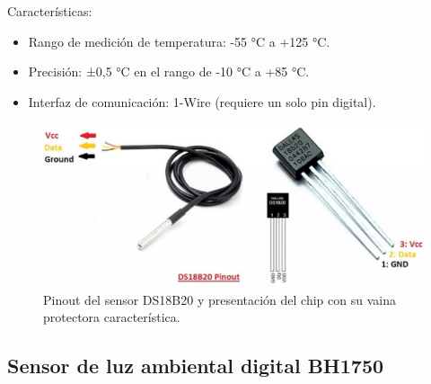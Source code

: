 Características:

\begin{itemize}
	\item Rango de medición de temperatura: -55 °C a +125 °C.
	\item Precisión: ±0,5 °C en el rango de -10 °C a +85 °C.
	\item Interfaz de comunicación: 1-Wire (requiere un solo pin digital).
\end{itemize}


\begin{figure}[h]
\centering
\includegraphics[scale=.5]{./Figures/ds18b20.png}
	\caption{Pinout del sensor DS18B20 y presentación del chip con su vaina protectora característica\protect\footnotemark.}
	\label{fig:ds18b20}
\end{figure}




\subsection{Sensor de luz ambiental digital BH1750}

